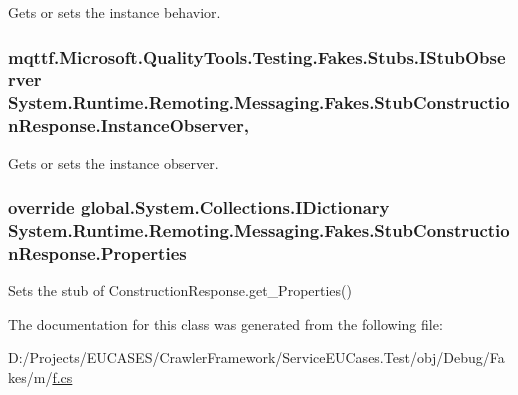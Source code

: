 Gets or sets the instance behavior.

\hypertarget{class_system_1_1_runtime_1_1_remoting_1_1_messaging_1_1_fakes_1_1_stub_construction_response_aa02f561d9a5eb6020b739242f5f23d12}{
\subsubsection[{Instance\-Observer}]{\setlength{\rightskip}{0pt plus 5cm}mqttf.\-Microsoft.\-Quality\-Tools.\-Testing.\-Fakes.\-Stubs.\-I\-Stub\-Observer System.\-Runtime.\-Remoting.\-Messaging.\-Fakes.\-Stub\-Construction\-Response.\-Instance\-Observer\hspace{0.3cm}{\ttfamily [get]}, {\ttfamily [set]}}}\label{class_system_1_1_runtime_1_1_remoting_1_1_messaging_1_1_fakes_1_1_stub_construction_response_aa02f561d9a5eb6020b739242f5f23d12}


Gets or sets the instance observer.

\hypertarget{class_system_1_1_runtime_1_1_remoting_1_1_messaging_1_1_fakes_1_1_stub_construction_response_a82e76f4d841d5ab61f9a2b1500e50798}{
\subsubsection[{Properties}]{\setlength{\rightskip}{0pt plus 5cm}override global.\-System.\-Collections.\-I\-Dictionary System.\-Runtime.\-Remoting.\-Messaging.\-Fakes.\-Stub\-Construction\-Response.\-Properties\hspace{0.3cm}{\ttfamily [get]}}}\label{class_system_1_1_runtime_1_1_remoting_1_1_messaging_1_1_fakes_1_1_stub_construction_response_a82e76f4d841d5ab61f9a2b1500e50798}


Sets the stub of Construction\-Response.\-get\-\_\-\-Properties()



The documentation for this class was generated from the following file\-:\begin{DoxyCompactItemize}
\item 
D\-:/\-Projects/\-E\-U\-C\-A\-S\-E\-S/\-Crawler\-Framework/\-Service\-E\-U\-Cases.\-Test/obj/\-Debug/\-Fakes/m/\hyperlink{m_2f_8cs}{f.\-cs}\end{DoxyCompactItemize}

